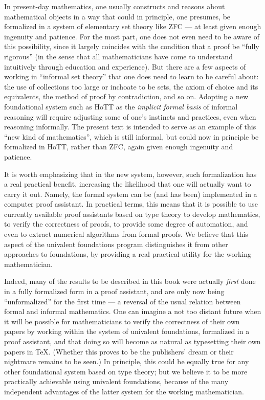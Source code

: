 {In present-day mathematics, one usually constructs and reasons about mathematical objects in a way that could in principle, one presumes, be formalized in a system of elementary set theory like ZFC --- at least given enough ingenuity and patience.
For the most part, one does not even need to be aware of this possibility, since it largely coincides with the condition that a proof be ``fully rigorous'' (in the sense that all mathematicians have come to understand intuitively through education and experience).
But there are a few aspects of working in ``informal set theory'' that one does need to learn to be careful about: the use of collections too large or inchoate to  be sets, the axiom of choice and its equivalents,  the method of proof by contradiction, and so on.
Adopting a new foundational system such as HoTT as the \emph{implicit formal basis} of informal reasoning will require adjusting some of one's instincts and practices, even when reasoning informally.
The present text is intended to serve as an example of this ``new kind of mathematics'', which is still informal, but could now in principle be formalized in HoTT, rather than ZFC, again given enough ingenuity and patience.

It is worth emphasizing that in the new system, however, such formalization has a real practical benefit, increasing the likelihood that one will actually want to carry it out.
Namely, the formal system can be (and has been) implemented in a computer proof assistant.
In practical terms, this means that it is possible to use currently available proof assistants based on type theory to develop mathematics, to verify the correctness of proofs, to provide some degree of automation, and even to extract numerical algorithms from formal proofs.  We believe that this aspect of the univalent foundations program distinguishes it from other approaches to foundations, by providing a real practical utility for the working mathematician.

Indeed, many of the results to be described in this book were actually \emph{first} done in a fully formalized form in a proof assistant, and are only now being ``unformalized'' for the first time --- a reversal of the usual relation between formal and informal mathematics.   One can imagine a not too distant future when it will be possible for mathematicians  to verify the correctness of their own papers by working within the system of univalent foundations, formalized in a proof assistant, and that doing so will become as natural as typesetting their own papers in \TeX. (Whether this proves to be the publishers' dream or their nightmare  remains to be seen.) 
In principle, this could be equally true for any other foundational system based on type theory; but we believe it to be more practically achievable using univalent foundations, because of the many independent advantages of the latter system for the working mathematician.

}
